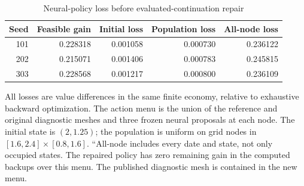 \begin{table}[t]
\centering
\caption{Neural-policy loss before evaluated-continuation repair}
\label{tab:r5_repair}
\small
\begin{tabular}{rrrrr}
\toprule
Seed & Feasible gain & Initial loss & Population loss & All-node loss \\
\midrule
101 & 0.228318 & 0.001058 & 0.000730 & 0.236122 \\
202 & 0.215071 & 0.001406 & 0.000783 & 0.245815 \\
303 & 0.228568 & 0.001217 & 0.000800 & 0.236109 \\
\bottomrule
\end{tabular}
\par\medskip
\begin{minipage}{.97\linewidth}
\footnotesize All losses are value differences in the same finite economy, relative to exhaustive backward optimization. The action menu is the union of the reference and original diagnostic meshes and three frozen neural proposals at each node. The initial state is $(2,1.25)$; the population is uniform on grid nodes in $[1.6,2.4]\times[0.8,1.6]$. ``All-node includes every date and state, not only occupied states. The repaired policy has zero remaining gain in the computed backups over this menu. The published diagnostic mesh is contained in the new menu.
\end{minipage}
\end{table}
